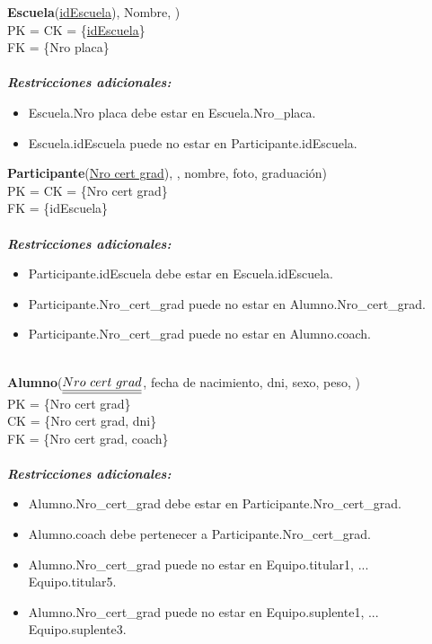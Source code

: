\noindent
\textbf{Escuela}(\underline{idEscuela}), Nombre, )\\
PK = CK = \{\underline{idEscuela}\}\\
FK = \{Nro placa\}\\\\
\textbf{\textit{Restricciones adicionales:}}
\begin{itemize}
    \item Escuela.Nro placa debe estar en Escuela.Nro\_placa.
    \item Escuela.idEscuela puede no estar en Participante.idEscuela.
\end{itemize}

\noindent
\textbf{Participante}(\underline{Nro cert grad}), , nombre, foto, graduación)\\
PK = CK = \{Nro cert grad\}\\
FK = \{idEscuela\}\\\\
\textbf{\textit{Restricciones adicionales:}}
\begin{itemize}
    \item Participante.idEscuela debe estar en Escuela.idEscuela.
    \item Participante.Nro\_cert\_grad puede no estar en Alumno.Nro\_cert\_grad.
    \item Participante.Nro\_cert\_grad puede no estar en Alumno.coach.
\end{itemize}\\

\noindent
\textbf{Alumno}($\doubleunderline{Nro\ cert\ grad}$, fecha de nacimiento, dni, sexo, peso,  )\\
PK = \{Nro cert grad\}\\
CK = \{Nro cert grad, dni\}\\
FK = \{Nro cert grad, coach\}\\\\
\textbf{\textit{Restricciones adicionales:}}
\begin{itemize}
    \item Alumno.Nro\_cert\_grad debe estar en Participante.Nro\_cert\_grad.
    \item Alumno.coach debe pertenecer a Participante.Nro\_cert\_grad.
    \item Alumno.Nro\_cert\_grad puede no estar en Equipo.titular1, ... Equipo.titular5.
    \item Alumno.Nro\_cert\_grad puede no estar en Equipo.suplente1, ... Equipo.suplente3.
\end{itemize}\\

